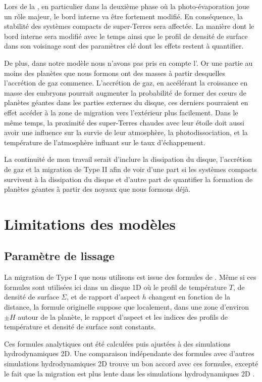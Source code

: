 \bigskip

Lors de la , en particulier dans la deuxième phase où la photo-évaporation joue un rôle majeur, le bord interne va être fortement modifié. En conséquence, la stabilité des systèmes compacts de super-Terres sera affectée. La manière dont le bord interne sera modifié avec le temps ainsi que le profil de densité de surface dans son voisinage sont des paramètres clé dont les effets restent à quantifier. 

De plus, dans notre modèle nous n'avons pas pris en compte l'. Or une partie au moins des planètes que nous
formons ont des masses à partir desquelles l'accrétion de gaz commence. L'accrétion de gaz, en accélérant la croissance en
masse des embryons pourrait augmenter la probabilité de former des cœurs de planètes géantes dans les parties externes du
disque, ces derniers pourraient en effet accéder à la zone de migration vers l'extérieur plus facilement. Dans le même temps, la
proximité des super-Terres chaudes avec leur étoile doit aussi avoir une influence sur la survie de leur atmosphère, la photodissociation, et la température de l'atmosphère influant sur le taux d'échappement. 

La continuité de mon travail serait d'inclure la dissipation du disque, l'accrétion de gaz et la migration de Type II afin de
voir d'une part si les systèmes compacts survivent à la dissipation du disque et d'autre part de quantifier la formation de
planètes géantes à partir des noyaux que nous formons déjà.

\section{Limitations des modèles}
\subsection{Paramètre de lissage}
La migration de Type I que nous utilisons est issue des formules de \cite{paardekooper2011torque}. Même si ces formules sont
utilisées ici dans un disque 1D où le profil de température $T$, de densité de surface $\Sigma$, et de rapport d'aspect $h$
changent en fonction de la distance, la formule originelle suppose que localement, dans une zone d'environ $\pm H$ autour de la
planète, le rapport d'aspect et les indices des profils de température et densité de surface sont constants. 

Ces formules analytiques ont été calculées puis ajustées à des simulations hydrodynamiques 2D. Une comparaison indépendante des formules avec d'autres simulations hydrodynamiques 2D trouve un bon accord avec ces formules, excepté le fait que la migration est plus lente dans les simulations hydrodynamiques 2D \citep{pierens2013making}. 

